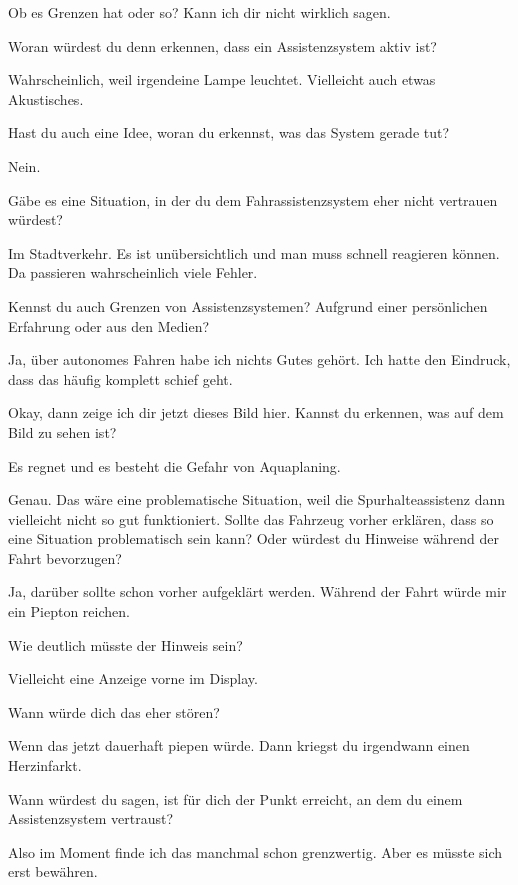 Ob es Grenzen hat oder so? Kann ich dir nicht wirklich sagen.

\interviewerin
Woran würdest du denn erkennen, dass ein Assistenzsystem aktiv ist?

Wahrscheinlich, weil irgendeine Lampe leuchtet. Vielleicht auch etwas
Akustisches.

\interviewerin
Hast du auch eine Idee, woran du erkennst, was das System gerade tut?

Nein.

\interviewerin
Gäbe es eine Situation, in der du dem Fahrassistenzsystem eher nicht
vertrauen würdest?

Im Stadtverkehr. Es ist unübersichtlich und man muss schnell reagieren
können. Da passieren wahrscheinlich viele Fehler.

\interviewerin
Kennst du auch Grenzen von Assistenzsystemen? Aufgrund einer
persönlichen Erfahrung oder aus den Medien?

Ja, über autonomes Fahren habe ich nichts Gutes gehört. Ich hatte den
Eindruck, dass das häufig komplett schief geht.

\interviewerin
Okay, dann zeige ich dir jetzt dieses Bild hier. Kannst du erkennen,
was auf dem Bild zu sehen ist?

Es regnet und es besteht die Gefahr von Aquaplaning.

\interviewerin
Genau. Das wäre eine problematische Situation, weil die
Spurhalteassistenz dann vielleicht nicht so gut funktioniert. Sollte
das Fahrzeug vorher erklären, dass so eine Situation problematisch sein
kann? Oder würdest du Hinweise während der Fahrt bevorzugen?

Ja, darüber sollte schon vorher aufgeklärt werden. Während der Fahrt
würde mir ein Piepton reichen.

\interviewerin
Wie deutlich müsste der Hinweis sein?

Vielleicht eine Anzeige vorne im Display.

\interviewerin
Wann würde dich das eher stören?

Wenn das jetzt dauerhaft piepen würde. Dann kriegst du irgendwann einen
Herzinfarkt.

\interviewerin
Wann würdest du sagen, ist für dich der Punkt erreicht, an dem du einem
Assistenzsystem vertraust?

Also im Moment finde ich das manchmal schon grenzwertig. Aber es müsste
sich erst bewähren.

